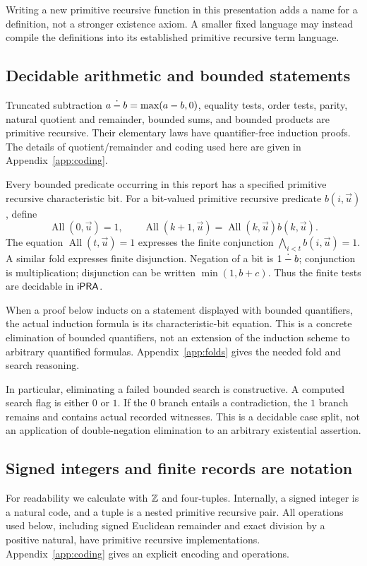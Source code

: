 Writing a new primitive recursive function in this presentation adds a
name for a definition, not a stronger existence axiom. A smaller fixed
language may instead compile the definitions into its established primitive
recursive term language.

\subsection{Decidable arithmetic and bounded statements}

Truncated subtraction $a\mathbin{\dot{-}} b=\max(a-b,0)$, equality tests, order tests,
parity, natural quotient and remainder, bounded sums, and bounded products
are primitive recursive. Their elementary laws have quantifier-free
induction proofs. The details of quotient/remainder and coding used here
are given in Appendix~\ref{app:coding}.

Every bounded predicate occurring in this report has a specified primitive
recursive characteristic bit. For a bit-valued primitive recursive
predicate $b(i,\vec u)$, define
\[
 \operatorname{All}(0,\vec u)=1,\qquad
 \operatorname{All}(k+1,\vec u)
   =\operatorname{All}(k,\vec u)b(k,\vec u).
\]
The equation $\operatorname{All}(t,\vec u)=1$ expresses the finite conjunction
$\bigwedge_{i<t}b(i,\vec u)=1$. A similar fold expresses finite disjunction.
Negation of a bit is $1\mathbin{\dot{-}} b$; conjunction is multiplication; disjunction
can be written $\min(1,b+c)$. Thus the finite tests are decidable in $\mathsf{iPRA}$.

When a proof below inducts on a statement displayed with bounded
quantifiers, the actual induction formula is its characteristic-bit
equation. This is a concrete elimination of bounded quantifiers, not an
extension of the induction scheme to arbitrary quantified formulas.
Appendix~\ref{app:folds} gives the needed fold and search reasoning.

In particular, eliminating a failed bounded search is constructive. A
computed search flag is either $0$ or $1$. If the $0$ branch entails a
contradiction, the $1$ branch remains and contains actual recorded witnesses.
This is a decidable case split, not an application of double-negation
elimination to an arbitrary existential assertion.

\subsection{Signed integers and finite records are notation}

For readability we calculate with $\mathbb Z$ and four-tuples. Internally, a signed
integer is a natural code, and a tuple is a nested primitive recursive pair.
All operations used below, including signed Euclidean remainder and exact
division by a positive natural, have primitive recursive implementations.
Appendix~\ref{app:coding} gives an explicit encoding and operations.

